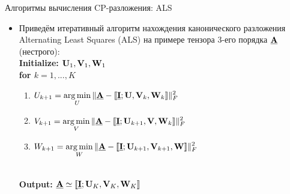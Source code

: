 \begin{frame}{Алгоритмы вычисления CP-разложения: ALS}

\begin{itemize}

    \item Приведём итеративный алгоритм нахождения канонического разложения Alternating Least Squares (ALS) на примере тензора 3-его порядка $\underline{\textbf{A}}$ (нестрого):
    \vspace{0.5cm}
    \\
    \textbf{Initialize: $\textbf{U}_1, \textbf{V}_1, \textbf{W}_1$} \\
    \textbf{for $k = 1, ..., K$}
    \begin{enumerate}
    \item $\displaystyle U_{k+1} = \operatorname*{arg\,min}_{U}{\lVert \underline{\textbf{A}} - \llbracket \underline{\textbf{I}} ; \textbf{U}, \textbf{V}_k,  \textbf{W}_k \rrbracket \rVert_F^2}$
    \item $\displaystyle V_{k+1} = \operatorname*{arg\,min}_{V}{\lVert \underline{\textbf{A}} - \llbracket \underline{\textbf{I}} ; \textbf{U}_{k+1}, \textbf{V},  \textbf{W}_k \rrbracket \rVert_F^2}$
    \item $\displaystyle W_{k+1} = \operatorname*{arg\,min}_{W}{\lVert \underline{\textbf{A}} - \llbracket \underline{\textbf{I}} ; \textbf{U}_{k+1}, \textbf{V}_{k+1},  \textbf{W} \rrbracket \rVert_F^2}$
    
    \end{enumerate} \\
    \textbf{Output: $\underline{\textbf{A}} \simeq \llbracket \underline{\textbf{I}} ; \textbf{U}_K, \textbf{V}_K, \textbf{W}_K \rrbracket$}  \\

\end{itemize}
\end{frame}


